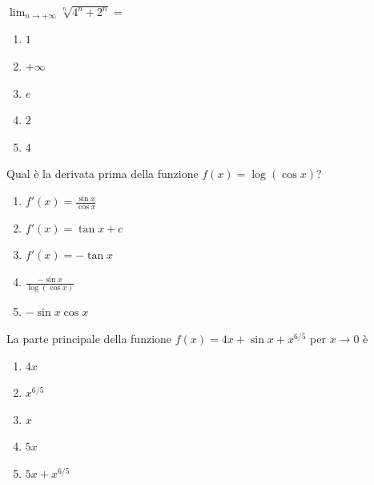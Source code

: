 \begin{quiz}
$\displaystyle\lim_{n\to+\infty}\sqrt[n]{4^n+2^n}=$
\begin{enumerate}[label=\alph*),leftmargin=1.3cm,itemsep=3pt,topsep=5pt]\item $1$\item $+\infty$\item $e$\item $2$\item $4$\end{enumerate}
\end{quiz}

\begin{quiz}
Qual \`e la derivata prima della funzione $f(x)=\log(\cos x)$?
\begin{enumerate}[label=\alph*),leftmargin=1.3cm,itemsep=3pt,topsep=5pt]\item $f'(x)=\frac{\sin x}{\cos x}$\item $f'(x)=\tan x+c$\item $f'(x)=-\tan x$\item $\frac{-\sin x}{\log(\cos x)}$\item $-\sin x\cos x$\end{enumerate}
\end{quiz}

\begin{quiz}
La parte principale della funzione $f(x)=4x+\sin x+x^{6/5}$ per $x\to0$ \`e
\begin{enumerate}[label=\alph*),leftmargin=1.3cm,itemsep=3pt,topsep=5pt]\item $4x$\item $x^{6/5}$\item $x$\item $5x$\item $5x+x^{6/5}$\end{enumerate}
\end{quiz}


